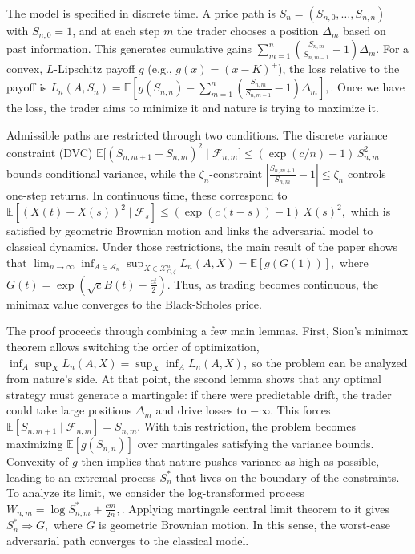 \documentclass[12pt]{article}
\begin{document}
The model is specified in discrete time. A price path is $S_n = (S_{n,0},\dots,S_{n,n})$ with $S_{n,0}=1$, and at each step $m$ the trader chooses a position $\Delta_m$ based on past information. This generates cumulative gains
$
\sum_{m=1}^n \left(\frac{S_{n,m}}{S_{n,m-1}} - 1\right)\Delta_m.
$
For a convex, $L$-Lipschitz payoff $g$ (e.g., $g(x)=(x-K)^+$), the loss relative to the payoff is
$
L_n(A,S_n) = \mathbb{E}\!\left[g(S_{n,n}) - \sum_{m=1}^n \left(\frac{S_{n,m}}{S_{n,m-1}} - 1\right)\Delta_m \right],
$.
Once we have the loss, the trader aims to minimize it and nature is trying to maximize it.

Admissible paths are restricted through two conditions. The discrete variance constraint (DVC)
$
\mathbb{E}\big[(S_{n,m+1} - S_{n,m})^2 \mid \mathcal{F}_{n,m}\big] \le (\exp(c/n)-1)\,S_{n,m}^2
$
bounds conditional variance, while the $\zeta_n$-constraint
$
\left|\frac{S_{n,m+1}}{S_{n,m}} - 1\right| \le \zeta_n
$
controls one-step returns. In continuous time, these correspond to
$
\mathbb{E}[(X(t)-X(s))^2 \mid \mathcal{F}_s] \le (\exp(c(t-s))-1)\,X(s)^2,
$
which is satisfied by geometric Brownian motion and links the adversarial model to classical dynamics. Under those restrictions, the main result of the paper shows that
$
\lim_{n\to\infty} \inf_{A \in \mathcal{A}_n} \sup_{X \in \mathcal{X}^n_{C,\zeta}} L_n(A,X)
=
\mathbb{E}[g(G(1))],
$
where $G(t)=\exp(\sqrt{c}B(t) - \tfrac{ct}{2})$. Thus, as trading becomes continuous, the minimax value converges to the Black-Scholes price.

The proof proceeds through combining a few main lemmas. First, Sion's minimax theorem allows switching the order of optimization,
$
\inf_A \sup_X L_n(A,X) = \sup_X \inf_A L_n(A,X),
$
so the problem can be analyzed from nature’s side. At that point, the second lemma shows that any optimal strategy must generate a martingale: if there were predictable drift, the trader could take large positions $\Delta_m$ and drive losses to $-\infty$. This forces
$
\mathbb{E}[S_{n,m+1} \mid \mathcal{F}_{n,m}] = S_{n,m}.
$
With this restriction, the problem becomes maximizing $\mathbb{E}[g(S_{n,n})]$ over martingales satisfying the variance bounds. Convexity of $g$ then implies that nature pushes variance as high as possible, leading to an extremal process $S_n^\ast$ that lives on the boundary of the constraints.
To analyze its limit, we consider the log-transformed process
$
W_{n,m} = \log S_{n,m}^\ast + \frac{cm}{2n},
$.
Applying  martingale central limit theorem to it gives
$
S_n^\ast \Rightarrow G,
$
where $G$ is geometric Brownian motion. In this sense, the worst-case adversarial path converges to the classical model.
\end{document}
